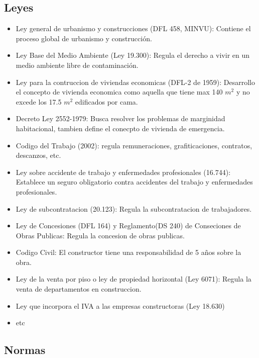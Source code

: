 \documentclass{article} %
\begin{document}
\subsection{Leyes}

\begin{itemize}[label={},left=0pt,align=parleft]
    \item \begin{highlightbox}[levelone] Ley general de urbanismo y construcciones (DFL 458, MINVU): Contiene el proceso global de urbanismo y construcción. \end{highlightbox}
    \item \begin{highlightbox}[levelone] Ley Base del Medio Ambiente (Ley 19.300): Regula el derecho a vivir en un medio ambiente libre de contaminación. \end{highlightbox}
    \item Ley para la contruccion de viviendas economicas (DFL-2 de 1959): Desarrollo el concepto de vivienda economica como aquella que tiene max 140 $m^2$ y no excede los 17.5 $m^2$ edificados por cama.
    \item Decreto Ley 2552-1979: Busca resolver los problemas de marginidad habitacional, tambien define el conecpto de vivienda de emergencia.
    \item  Codigo del Trabajo (2002): regula remuneraciones, grafiticaciones, contratos, descanzos, etc.
    \item Ley sobre accidente de trabajo y enfermedades profesionales (16.744): Establece un seguro obligatorio contra accidentes del trabajo y enfermedades profesionales.
    \item Ley de subcontratacion (20.123): Regula la subcontratacion de trabajadores.
    \item Ley de Concesiones (DFL 164) y Reglamento(DS 240) de Conseciones de Obras Publicas: Regula la concesion de obras publicas.
    \item Codigo Civil: El constructor tiene una responsabilidad de 5 años sobre la obra.
    \item Ley de la venta por piso o ley de propiedad horizontal (Ley 6071): Regula la venta de departamentos en construccion.
    \item Ley que incorpora el IVA a las empresas constructoras (Ley 18.630)
    \item etc
\end{itemize}

\subsection{Normas}
\end{document}
